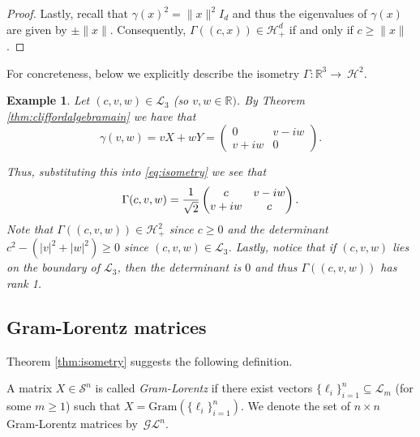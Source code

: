 \documentclass{siamart}
\newtheorem{example}{Example}[section]
\begin{document}
{{\begin{proof}
Lastly, recall that $\gamma(x)^2=\|x\|^2I_d$  and  thus the eigenvalues of $\gamma(x)$ are given by ${\pm \|x\|}$.  Consequently,
$\Gamma((c,x))\in {\mathcal{H}}^d_+$  if and only if $  c \ge {\|x\|}$.
\end{proof}
\vspace{0.1cm} 

For concreteness,  below  we explicitly describe  the isometry $\Gamma: {\mathbb{R}}^3\rightarrow~{\mathcal{H}}^2$.
\medskip 

\begin{example} \label{ex:23isometry}
Let $(c,v,w)\in {\mathcal{L}}_3$ (so $v,w\in {\mathbb{R}})$.  By Theorem  \ref{thm:cliffordalgebramain} we have that
$$\gamma(v,w)=vX+wY=\begin{pmatrix}
0 & v-iw\\v+iw & 0
\end{pmatrix}.
$$

Thus, substituting this  into \eqref{eq:isometry}  we see that
\begin{equation}\label{eq:32phi}
\Gamma(c, v, w)={1\over \sqrt{2}}\begin{pmatrix}
c & v-iw\\v+iw & c
\end{pmatrix}.
\end{equation} Note that ${\Gamma((c, v, w))} \in {\mathcal{H}}^2_+$   since $c \geq 0$ and the
determinant $c^2-(|v|^2+|w|^2) \geq 0$ since $(c,v,w)\in {\mathcal{L}}_3$. Lastly, notice that if $(c,v,w)$ lies  on the boundary of ${\mathcal{L}}_3$, then the determinant is $0$ and thus ${\Gamma((c, v, w))}$ has rank 1.
\end{example}

\subsection{Gram-Lorentz matrices}\label{sec:glmatrices}

{Theorem \ref{thm:isometry}  suggests  the following definition.}
\medskip 
\begin{definition} A
matrix $X {\in {\mathcal{S}}^n}$ is called  {\em Gram-Lorentz} if  there exist  vectors $\{\ell_i\}_{i=1}^n\subseteq {\mathcal{L}}_m$ (for some $m\ge 1$) such that $X={\mathrm{Gram}}(\{\ell_i\}_{i=1}^n).$
We denote  the set of $n\times n$ Gram-Lorentz matrices by~${\mathcal{GL}}^n$.
\end{definition}
\medskip 

}}
\end{document}
